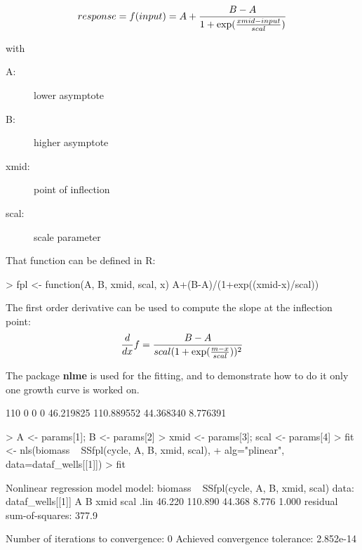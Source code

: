 \documentclass[a4paper,twoside]{article}
\newcommand{\pkg}{\textbf}
\begin{document}
\[\mathnormal{response} = \mathnormal{f}(\mathnormal{input}) = A + \frac{ B - A }{ 1 + \exp(\frac{\mathnormal{xmid}-\mathnormal{input}}{\mathnormal{scal}})}\]

with
\begin{description}
\item[A: ] lower asymptote
\item[B: ] higher asymptote
\item[xmid: ] point of inflection
\item[scal: ] scale parameter
\end{description}
That function can be defined in R:
\begin{Schunk}
\begin{Sinput}
> fpl <- function(A, B, xmid, scal, x) A+(B-A)/(1+exp((xmid-x)/scal))
\end{Sinput}
\end{Schunk}

The first order derivative can be used to compute the slope at the inflection point:
\[\frac{d}{dx} f = \frac{B - A}{\mathnormal{scal} (1+\exp(\frac{m-\mathnormal{x}}{\mathnormal{scal}}))^2} \]




The package \pkg{nlme} is used for the fitting, and to demonstrate how to do it only one growth curve is worked on.
\begin{Schunk}
\begin{Soutput}
       110          0          0          0 
 46.219825 110.889552  44.368340   8.776391 
\end{Soutput}
\begin{Sinput}
> A <- params[1]; B <- params[2]
> xmid <- params[3]; scal <- params[4]
> fit <- nls(biomass ~ SSfpl(cycle, A, B, xmid, scal), 
+            alg="plinear", data=dataf_wells[[1]])
> fit
\end{Sinput}
\begin{Soutput}
Nonlinear regression model
  model:  biomass ~ SSfpl(cycle, A, B, xmid, scal) 
   data:  dataf_wells[[1]] 
      A       B    xmid    scal    .lin 
 46.220 110.890  44.368   8.776   1.000 
 residual sum-of-squares: 377.9

Number of iterations to convergence: 0 
Achieved convergence tolerance: 2.852e-14 
\end{Soutput}
\end{Schunk}
\end{document}
